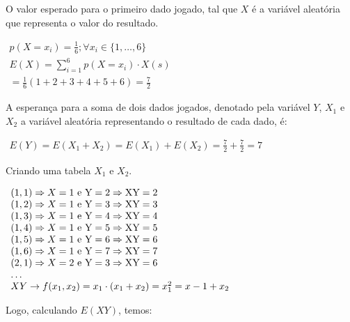 \item
O valor esperado para o primeiro dado jogado, tal que $X$ é a variável aleatória que representa o valor do resultado.

$\begin{array}{l}
p({X=x_i}) = \frac{1}{6}; \forall x_i \in \{1, \dots, 6 \}\\
E(X) = \sum\nolimits_{i = 1}^6 {p({X=x_i}) \cdot X(s)} \\
= \frac{1}{6}\left( 1+2+3+4+5+6 \right) = \frac{7}{2}
\end{array}$

A esperança para a soma de dois dados jogados, denotado pela variável $Y$, $X_1$ e $X_2$ a variável aleatória representando o resultado de cada dado, é:

$\begin{array}{l}
E(Y) = E(X_1 + X_2) = E(X_1) + E(X_2) = \frac{7}{2} + \frac{7}{2} = 7
\end{array}$

Criando uma tabela $X_1$ e $X_2$.

$\begin{array}{l}
(1, 1) \Rightarrow X = 1 \rm{\ e\ } Y = 2 \Rightarrow XY = 2\\
(1, 2) \Rightarrow X = 1 \rm{\ e\ } Y = 3 \Rightarrow XY = 3\\
(1, 3) \Rightarrow X = 1 \rm{\ e\ } Y = 4 \Rightarrow XY = 4\\
(1, 4) \Rightarrow X = 1 \rm{\ e\ } Y = 5 \Rightarrow XY = 5\\
(1, 5) \Rightarrow X = 1 \rm{\ e\ } Y = 6 \Rightarrow XY = 6\\
(1, 6) \Rightarrow X = 1 \rm{\ e\ } Y = 7 \Rightarrow XY = 7\\
(2, 1) \Rightarrow X = 2 \rm{\ e\ } Y = 3 \Rightarrow XY = 6\\
\dots \\
XY \rightarrow f(x_1, x_2) = x_1 \cdot (x_1+x_2) = x_1^2 = x-1+x_2
\end{array}$

Logo, calculando $E(XY)$, temos:

